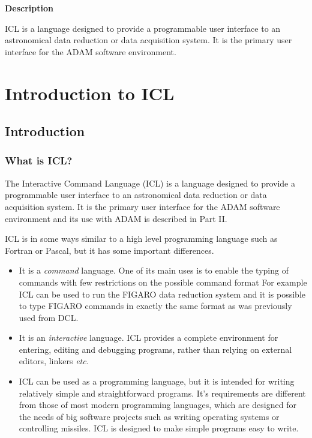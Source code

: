 \begin{center}
{\Large\bf Description}
\end{center}

ICL is a language designed to provide
a programmable user interface to an astronomical data reduction or data
acquisition system. 
It is the primary user interface for the ADAM software environment.

\markright{\stardocname}
\newpage
\markright{\stardocname}


  \setlength{\parskip}{0mm}
  \tableofcontents
  \setlength{\parskip}{\medskipamount}
  \markright{\stardocname}
  \newpage
\renewcommand{\thepage}{\arabic{page}}
\setcounter{page}{1}

   \part{Introduction to ICL}
   \chapter{Introduction}
   \section{What is ICL?}
The Interactive Command Language (ICL) is a language designed to provide
a programmable user interface to an astronomical data reduction or data
acquisition system. 
It is the primary user interface for the ADAM software environment and its use
with ADAM is described in Part II.

ICL is in some ways similar to a high level programming
language such as Fortran or Pascal, but it has some important differences.
   \begin{itemize}
   \item It is a {\em command} language. One of its main uses is to enable
the typing of commands with few restrictions on the possible command format
For example ICL can be used to run the FIGARO data reduction system and
it is possible to type FIGARO commands in
exactly the same format as was previously used from DCL.
   \item It is an {\em interactive} language. ICL provides a complete 
environment for entering, editing and debugging programs, rather than
relying on external editors, linkers {\em etc.} 
   \item ICL can be used as a programming language, but it is
intended for writing relatively simple and straightforward programs.
It's requirements are different from those of most modern programming languages,
which are designed for the needs of big software projects such as writing
operating systems or controlling missiles. ICL is designed to make simple
programs easy to write.
   \end{itemize}
